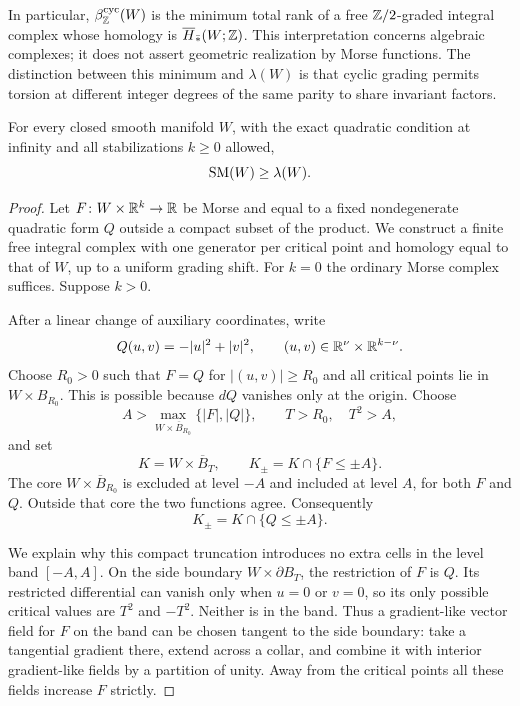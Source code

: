 In particular, $\beta_{\mathbb Z}^{\mathrm{cyc}}(W)$ is the minimum total
rank of a free $\mathbb Z/2$-graded integral complex whose homology is
$\overline H_{\bar *}(W;\mathbb Z)$.  This interpretation concerns algebraic
complexes; it does not assert geometric realization by Morse functions.
The distinction between this minimum and $\lambda(W)$ is that cyclic
grading permits torsion at different integer degrees of the same
parity to share invariant factors.

\begin{proposition}\label{morse:stable}
For every closed smooth manifold $W$, with the exact quadratic
condition at infinity and all stabilizations $k\geq0$ allowed,
\[
 \operatorname{SM}(W)\geq\lambda(W).
\]
\end{proposition}

\begin{proof}
Let $F\colon W\times\mathbb R^k\to\mathbb R$ be Morse and equal to a fixed
nondegenerate quadratic form $Q$ outside a compact subset of the
product.  We construct a finite free integral complex with one
generator per critical point and homology equal to that of $W$, up
to a uniform grading shift.  For $k=0$ the ordinary Morse complex
suffices.  Suppose $k>0$.

After a linear change of auxiliary coordinates, write
\[
 Q(u,v)=-|u|^2+|v|^2,
 \qquad (u,v)\in\mathbb R^{\nu}\times\mathbb R^{k-\nu}.
\]
Choose $R_0>0$ such that $F=Q$ for $|(u,v)|\geq R_0$ and all
critical points lie in $W\times B_{R_0}$.  This is possible because
$dQ$ vanishes only at the origin.  Choose
\[
 A>\max_{W\times\overline B_{R_0}}\{|F|,|Q|\},
 \qquad T>R_0,\quad T^2>A,
\]
and set
\[
 K=W\times\overline B_T,\qquad
 K_\pm=K\cap\{F\leq\pm A\}.
\]
The core $W\times\overline B_{R_0}$ is excluded at level $-A$
and included at level $A$, for both $F$ and $Q$.  Outside that core
the two functions agree.  Consequently
\begin{equation}\label{morse:endpoints}
 K_\pm=K\cap\{Q\leq\pm A\}.
\end{equation}

We explain why this compact truncation introduces no extra cells in
the level band $[-A,A]$.  On the side boundary
$W\times\partial B_T$, the restriction of $F$ is $Q$.
Its restricted differential can vanish only when $u=0$ or $v=0$,
so its only possible critical values are $T^2$ and $-T^2$.
Neither is in the band.  Thus a gradient-like vector field for $F$
on the band can be chosen tangent to the side boundary: take a
tangential gradient there, extend across a collar, and combine it
with interior gradient-like fields by a partition of unity.
Away from the critical points all these fields increase $F$ strictly.


\end{proof}
